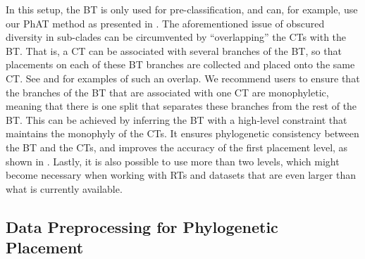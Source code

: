 In this setup, the \ac{BT} is only used for pre-classification,
and can, for example, use our \ac{PhAT} method as presented in .
The aforementioned issue of obscured diversity in sub-clades can be circumvented
by ``overlapping'' the \acp{CT} with the \ac{BT}.
That is, a \ac{CT} can be associated with several branches of the \ac{BT},
so that placements on each of these \ac{BT} branches are collected and placed onto the same \ac{CT}.
See  and  for examples of such an overlap.
We recommend users to ensure that the branches of the \ac{BT} that are associated with one \ac{CT} are monophyletic,
meaning that there is one split that separates these branches from the rest of the \ac{BT}.
This can be achieved by inferring the \ac{BT} with a high-level constraint that maintains the monophyly of the \acp{CT}.
It ensures phylogenetic consistency between the \ac{BT} and the \acp{CT},
and improves the accuracy of the first placement level,
as shown in .
Lastly, it is also possible to use more than two levels,
which might become necessary when working with \acp{RT} and datasets
that are even larger than what is currently available.


\subsection{Data Preprocessing for Phylogenetic Placement}
\label{ch:AutomaticTrees:sec:Methods:sub:DataPreprocessing}

